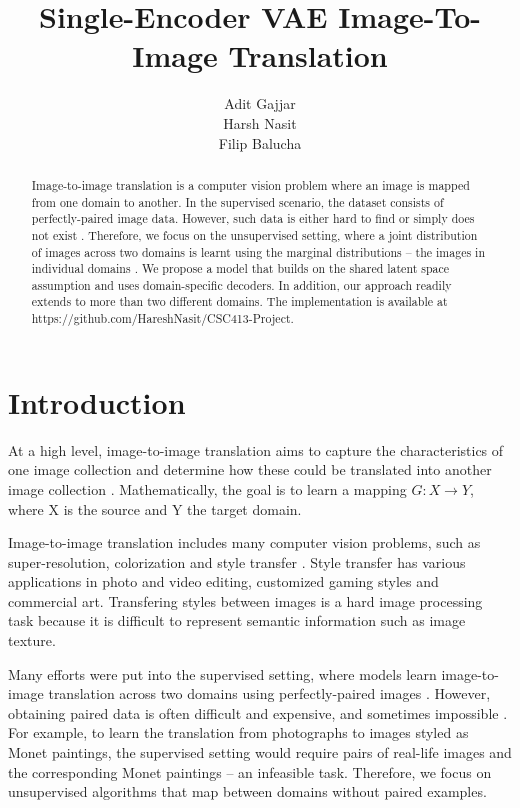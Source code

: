 \documentclass{article}
\title{Single-Encoder VAE Image-To-Image Translation}
\author{%
  Adit Gajjar
  \\
  \And
  Harsh Nasit \\
  \And
  Filip Balucha \\
}
\begin{document}
\maketitle

\begin{abstract}
  Image-to-image translation is a computer vision problem where an image is mapped from one domain to another. In the supervised scenario, the dataset consists of perfectly-paired image data. However, such data is either hard to find or simply does not exist \citep{zhu}. Therefore, we focus on the unsupervised setting, where a joint distribution of images across two domains is learnt using the marginal distributions – the images in individual domains \citep{liu}. We propose a model that builds on the shared latent space assumption and uses domain-specific decoders. In addition, our approach readily extends to more than two different domains. The implementation is available at https://github.com/HareshNasit/CSC413-Project.
\end{abstract}
\section{Introduction}
At a high level, image-to-image translation aims to capture the characteristics of one image collection and determine how these could be translated into another image collection \citep{zhu}. Mathematically, the goal is to learn a mapping $G: X \rightarrow Y$, where X is the source and Y the target domain.

Image-to-image translation includes many computer vision problems, such as super-resolution, colorization and style transfer \citep{liu}. Style transfer has various applications in photo and video editing, customized gaming styles and commercial art. Transfering styles between images is a hard image processing task because it is difficult to represent semantic information such as image texture.

Many efforts were put into the supervised setting, where models learn image-to-image translation across two domains using perfectly-paired images \citep{zhu}. However, obtaining paired data is often difficult and expensive, and sometimes impossible \citep{zhu}. For example, to learn the translation from photographs to images styled as Monet paintings, the supervised setting would require pairs of real-life images and the corresponding Monet paintings – an infeasible task. Therefore, we focus on unsupervised algorithms that map between domains without paired examples.
\end{document}
